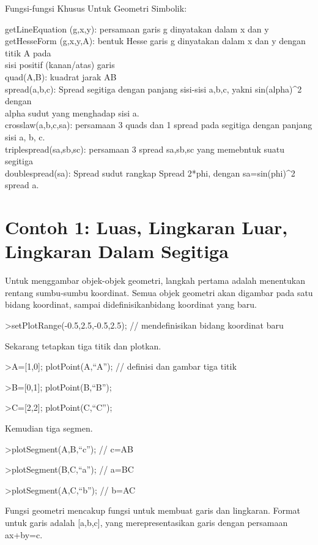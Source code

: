 \documentclass[
]{book}
\begin{document}
Fungsi-fungsi Khusus Untuk Geometri Simbolik:

getLineEquation (g,x,y): persamaan garis g dinyatakan dalam x dan y\\
getHesseForm (g,x,y,A): bentuk Hesse garis g dinyatakan dalam x dan y dengan titik A pada\\
sisi positif (kanan/atas) garis\\
quad(A,B): kuadrat jarak AB\\
spread(a,b,c): Spread segitiga dengan panjang sisi-sisi a,b,c, yakni sin(alpha)\^{}2 dengan\\
alpha sudut yang menghadap sisi a.\\
crosslaw(a,b,c,sa): persamaan 3 quads dan 1 spread pada segitiga dengan panjang sisi a, b, c.\\
triplespread(sa,sb,sc): persamaan 3 spread sa,sb,sc yang memebntuk suatu segitiga\\
doublespread(sa): Spread sudut rangkap Spread 2*phi, dengan sa=sin(phi)\^{}2 spread a.

\section{Contoh 1: Luas, Lingkaran Luar, Lingkaran Dalam Segitiga}\label{contoh-1-luas-lingkaran-luar-lingkaran-dalam-segitiga}

Untuk menggambar objek-objek geometri, langkah pertama adalah menentukan rentang sumbu-sumbu koordinat. Semua objek geometri akan digambar pada satu bidang koordinat, sampai didefinisikanbidang koordinat yang baru.

\textgreater setPlotRange(-0.5,2.5,-0.5,2.5); // mendefinisikan bidang koordinat baru

Sekarang tetapkan tiga titik dan plotkan.

\textgreater A={[}1,0{]}; plotPoint(A,``A''); // definisi dan gambar tiga titik

\textgreater B={[}0,1{]}; plotPoint(B,``B'');

\textgreater C={[}2,2{]}; plotPoint(C,``C'');

Kemudian tiga segmen.

\textgreater plotSegment(A,B,``c''); // c=AB

\textgreater plotSegment(B,C,``a''); // a=BC

\textgreater plotSegment(A,C,``b''); // b=AC

Fungsi geometri mencakup fungsi untuk membuat garis dan lingkaran. Format untuk garis adalah {[}a,b,c{]}, yang merepresentasikan garis dengan persamaan ax+by=c.
\end{document}
